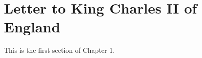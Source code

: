 \documentclass[chapterpreface_main.tex]{subfiles}
\begin{document}
	

	\section{Letter to King Charles II of England}
	This is the first section of Chapter 1.
\end{document}
